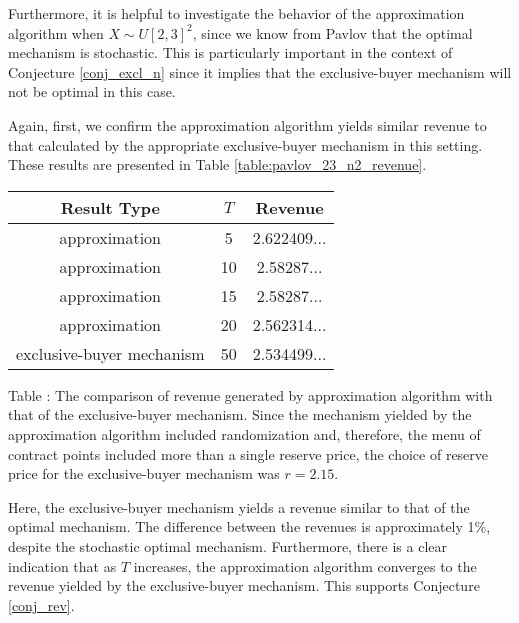 
Furthermore, it is helpful to investigate the behavior of the approximation algorithm when $X \sim U[2,3]^2$, since we know from Pavlov \autocite*{pavlov2011optimal} that the optimal mechanism is stochastic. This is particularly important in the context of Conjecture \ref{conj_excl_n} since it implies that the exclusive-buyer mechanism will not be optimal in this case.

Again, first, we confirm the approximation algorithm yields similar revenue to that calculated by the appropriate exclusive-buyer mechanism in this setting. These results are presented in Table \ref{table:pavlov_23_n2_revenue}.

\begin{center}
    \begin{tabular}{ |c|c|c| } 
    \hline
    Result Type & $T$ & Revenue \\
    \hline
    \hline
    approximation & 5 & 2.622409... \\ 
    approximation & 10 & 2.58287... \\ 
    approximation & 15 & 2.58287... \\ 
    approximation & 20 & 2.562314... \\ 
    exclusive-buyer mechanism & 50 & 2.534499... \\
    \hline
    \end{tabular}

    \vspace{1mm}
    \raggedright{\small {\sc Table \thefig\label{table:pavlov_23_n2_revenue}:} The comparison of revenue generated by approximation algorithm with that of the exclusive-buyer mechanism. Since the mechanism yielded by the approximation algorithm included randomization and, therefore, the menu of contract points included more than a single reserve price, the choice of reserve price for the exclusive-buyer mechanism was $r=2.15$.}
\end{center}

\noindent Here, the exclusive-buyer mechanism yields a revenue similar to that of the optimal mechanism. The difference between the revenues is approximately 1\%, despite the stochastic optimal mechanism. Furthermore, there is a clear indication that as $T$ increases, the approximation algorithm converges to the revenue yielded by the exclusive-buyer mechanism. This supports Conjecture \ref{conj_rev}.

